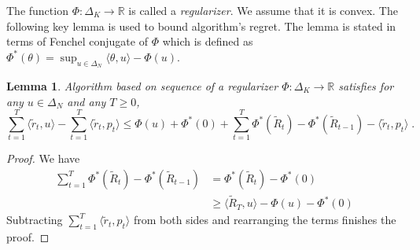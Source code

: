 \documentclass{article}
\newtheorem{lemma}{Lemma}
\newcommand{\R}{\mathbb{R}}
\DeclareMathOperator{\Regret}{Regret}
\DeclareMathOperator{\Exp}{\mathbf{E}}
\begin{document}
The function $\Phi:\Delta_K \to \R$ is called a \emph{regularizer}. We assume
that it is convex.  The following key lemma is used to bound algorithm's
regret. The lemma is stated in terms of Fenchel conjugate of $\Phi$ which is
defined as $\Phi^*(\theta) = \sup_{u \in \Delta_N} \langle \theta, u \rangle -
\Phi(u)$.

\begin{lemma}
Algorithm based on sequence of a regularizer $\Phi:\Delta_K \to \R$ satisfies
for any $u \in \Delta_N$ and any $T \ge 0$,
$$
\sum_{t=1}^T \langle \widetilde r_t, u \rangle - \sum_{t=1}^T \langle \widetilde r_t, p_t \rangle
\le \Phi(u) + \Phi^*(0) + \sum_{t=1}^T \Phi^*(\widetilde R_t) - \Phi^*(\widetilde R_{t-1}) - \langle \widetilde r_t, p_t \rangle \; .
$$
\end{lemma}

\begin{proof}
We have
\begin{align*}
\sum_{t=1}^T \Phi^*(\widetilde R_t) - \Phi^*(\widetilde R_{t-1})
& = \Phi^*(\widetilde R_t) - \Phi^*(0) \\
& \ge \langle \widetilde R_T, u \rangle -  \Phi(u) - \Phi^*(0)
\end{align*}
Subtracting $\sum_{t=1}^T \langle \widetilde r_t, p_t \rangle$ from both sides
and rearranging the terms finishes the proof.
\end{proof}

\end{document}
